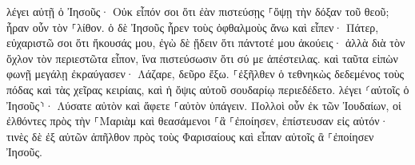 \documentclass{openreader}
\begin{document}
λέγει αὐτῇ ὁ Ἰησοῦς· Οὐκ εἶπόν σοι ὅτι ἐὰν πιστεύσῃς ⸀ὄψῃ τὴν δόξαν τοῦ θεοῦ; 
ἦραν οὖν τὸν ⸀λίθον. ὁ δὲ Ἰησοῦς ἦρεν τοὺς ὀφθαλμοὺς ἄνω καὶ εἶπεν· Πάτερ, εὐχαριστῶ σοι ὅτι ἤκουσάς μου, 
ἐγὼ δὲ ᾔδειν ὅτι πάντοτέ μου ἀκούεις· ἀλλὰ διὰ τὸν ὄχλον τὸν περιεστῶτα εἶπον, ἵνα πιστεύσωσιν ὅτι σύ με ἀπέστειλας. 
καὶ ταῦτα εἰπὼν φωνῇ μεγάλῃ ἐκραύγασεν· Λάζαρε, δεῦρο ἔξω. 
⸀ἐξῆλθεν ὁ τεθνηκὼς δεδεμένος τοὺς πόδας καὶ τὰς χεῖρας κειρίαις, καὶ ἡ ὄψις αὐτοῦ σουδαρίῳ περιεδέδετο. λέγει ⸂αὐτοῖς ὁ Ἰησοῦς⸃· Λύσατε αὐτὸν καὶ ἄφετε ⸀αὐτὸν ὑπάγειν. 
Πολλοὶ οὖν ἐκ τῶν Ἰουδαίων, οἱ ἐλθόντες πρὸς τὴν ⸀Μαριὰμ καὶ θεασάμενοι ⸀ἃ ⸀ἐποίησεν, ἐπίστευσαν εἰς αὐτόν· 
τινὲς δὲ ἐξ αὐτῶν ἀπῆλθον πρὸς τοὺς Φαρισαίους καὶ εἶπαν αὐτοῖς ἃ ⸀ἐποίησεν Ἰησοῦς. 
\end{document}
